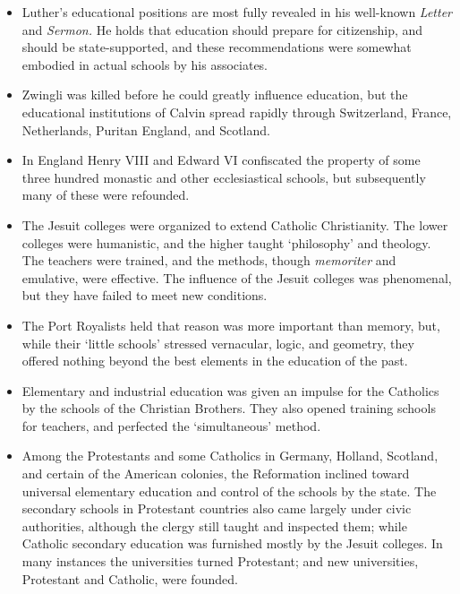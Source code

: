 \documentclass[
]{book}
\providecommand{\tightlist}{%
  \setlength{\itemsep}{0pt}\setlength{\parskip}{0pt}}
\begin{document}
\begin{itemize}
\tightlist
\item
  Luther's educational positions are most fully revealed in his well-known \emph{Letter} and \emph{Sermon.} He holds that education should prepare for citizenship, and should be state-supported, and these recommendations were somewhat embodied in actual schools by his associates.
\item
  Zwingli was killed before he could greatly influence education, but the educational institutions of Calvin spread rapidly through Switzerland, France, Netherlands, Puritan England, and Scotland.
\item
  In England Henry VIII and Edward VI confiscated the property of some three hundred monastic and other ecclesiastical schools, but subsequently many of these were refounded.
\item
  The Jesuit colleges were organized to extend Catholic Christianity. The lower colleges were humanistic, and the higher taught `philosophy' and theology. The teachers were trained, and the methods, though \emph{memoriter} and emulative, were effective. The influence of the Jesuit colleges was phenomenal, but they have failed to meet new conditions.
\item
  The Port Royalists held that reason was more important than memory, but, while their `little schools' stressed vernacular, logic, and geometry, they offered nothing beyond the best elements in the education of the past.
\item
  Elementary and industrial education was given an impulse for the Catholics by the schools of the Christian Brothers. They also opened training schools for teachers, and perfected the `simultaneous' method.
\item
  Among the Protestants and some Catholics in Germany, Holland, Scotland, and certain of the American colonies, the Reformation inclined toward universal elementary education and control of the schools by the state. The secondary schools in Protestant countries also came largely under civic authorities, although the clergy still taught and inspected them; while Catholic secondary education was furnished mostly by the Jesuit colleges. In many instances the universities turned Protestant; and new universities, Protestant and Catholic, were founded.
\end{itemize}
\end{document}
